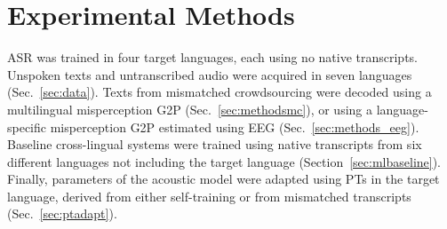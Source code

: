 \section{Experimental Methods}
\label{sec:methods}

ASR was trained in four target languages, each using no native
transcripts.  Unspoken texts and untranscribed audio were acquired
in seven languages (Sec.~\ref{sec:data}).  Texts from mismatched
crowdsourcing were decoded using a multilingual misperception G2P
(Sec.~\ref{sec:methodsmc}), or using a language-specific misperception
G2P estimated using EEG (Sec.~\ref{sec:methods_eeg}).  Baseline
cross-lingual systems were trained using native transcripts from
six different languages not including the target language
(Section~\ref{sec:mlbaseline}).  Finally, parameters of the acoustic
model were adapted using PTs in the target language, derived from
either self-training or from mismatched transcripts
(Sec.~\ref{sec:ptadapt}).

